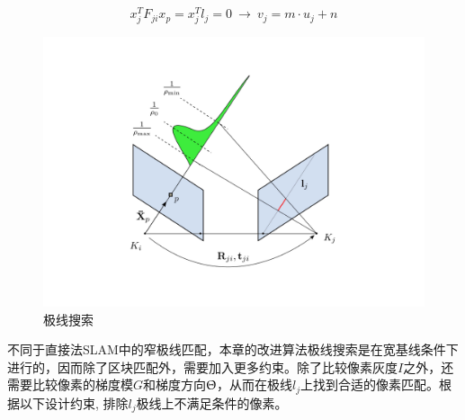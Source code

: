 \begin{equation}
\label{equ4.1}
x_j^T F_{ji}x_p = x^T_jl_j=0 \  \rightarrow \  v_j = m \cdot u_j+n
\end{equation}

\begin{figure}
\centering
\includegraphics[scale=0.25,angle=-90]{figures/Fig4-2.pdf}
\caption{极线搜索}
\label{fig4.2}
\end{figure}

不同于直接法SLAM中的窄极线匹配，本章的改进算法极线搜索是在宽基线条件下进行的，因而除了区块匹配外，需要加入更多约束。除了比较像素灰度$I$之外，还需要比较像素的梯度模$G$和梯度方向$\Uptheta$，从而在极线$l_j$上找到合适的像素匹配。根据以下设计约束, 排除$l_j$极线上不满足条件的像素。


